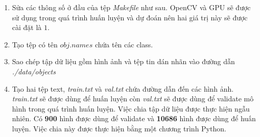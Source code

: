 \begin{enumerate}
	\item Sửa các thông số ở đầu của tệp \emph{Makefile} như sau. OpenCV và GPU sẽ được sử dụng trong quá trình huấn luyện và dự đoán nên hai giá trị này sẽ được cài đặt là $1$.

\noindent{}

	\item Tạo tệp có tên $obj.names$ chứa tên các class.

\noindent{}

	\item Sao chép tập dữ liệu gồm hình ảnh và tệp tin dán nhãn vào đường dẫn \emph{./data/objects}

	\item Tạo hai tệp text, \emph{train.txt} và \emph{val.txt} chứa đường dẫn đến các hình ảnh. \emph{train.txt} sẽ được dùng để huấn luyện còn \emph{val.txt} sẽ được dùng để validate mô hình trong quá trình huấn luyện. Việc chia tập dữ liệu được thực hiện ngẫu nhiên. Có \textbf{900} hình được dùng để validate và \textbf{10686} hình được dùng để huấn luyện. Việc chia này được thực hiện bằng một chương trình Python.

\noindent{}
\end{enumerate}
